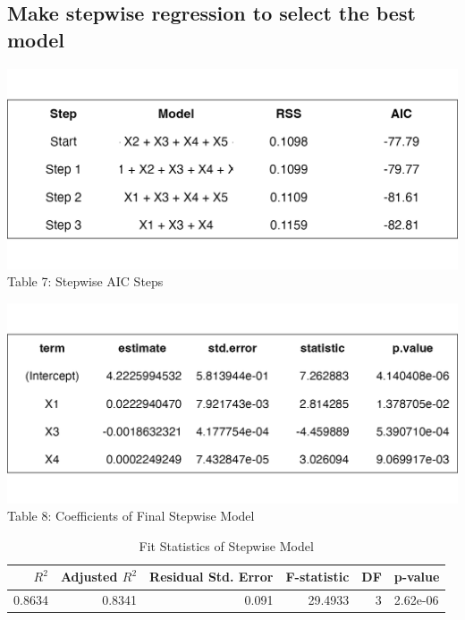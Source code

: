 \documentclass[
  11pt,
]{article}
\begin{document}
\subsection{Make stepwise regression to select the best
model}\label{make-stepwise-regression-to-select-the-best-model}

\begin{minipage}{0.48\textwidth}
\centering
\includegraphics[width=\linewidth]{stepwise_aic_table.png}
\vspace{0.3em}
\small Table 7: Stepwise AIC Steps
\end{minipage}
\hfill
\begin{minipage}{0.48\textwidth}
\centering
\includegraphics[width=\linewidth]{stepwise_coef_table.png}\\
\small Table 8: Coefficients of Final Stepwise Model
\end{minipage}

\addtocounter{table}{2}

\begin{table}[!h]
\centering
\caption{\label{tab:unnamed-chunk-8}Fit Statistics of Stepwise Model}
\centering
\fontsize{8}{10}\selectfont
\begin{tabular}[t]{rrrrrl}
\toprule
$R^2$ & Adjusted $R^2$ & Residual Std. Error & F-statistic & DF & p-value\\
\midrule
0.8634 & 0.8341 & 0.091 & 29.4933 & 3 & 2.62e-06\\
\bottomrule
\end{tabular}
\end{table}
\end{document}
